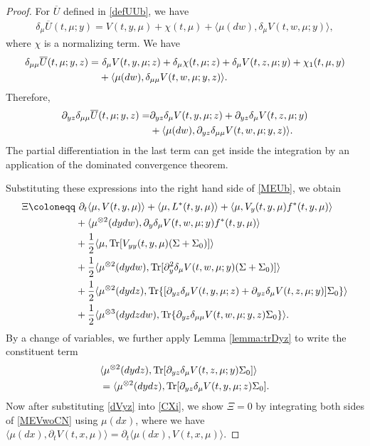 \documentclass{amsart}
\theoremstyle{definition}
\theoremstyle{remark}
\numberwithin{equation}{section}
\begin{document}
\begin{proof}
For $\overline U$ defined in \eqref{defUUb},
we  have
\begin{align}
\delta_\mu\overline U(t, \mu;y)= V(t,y,\mu) + \chi(t,\mu) +\langle \mu(dw), \delta_\mu V(t, w, \mu;y) \rangle, \label{oUdmu1}
\end{align}
where $\chi$ is a normalizing term.
We have
\begin{align}
\delta_{\mu\mu}\overline U(t, \mu; y,z) = &\ \delta_\mu V(t, y, \mu; z)+\delta_\mu\chi(t, \mu;z) +\delta_\mu V(t, z, \mu; y)+\chi_1(t,\mu,y) \label{oUdu2}\\
&  +\langle \mu(dw),  \delta_{\mu\mu} V (t,w,\mu;y,z) \rangle.\notag
\end{align}
Therefore,
\begin{align}
\partial_{yz}\delta_{\mu\mu}\overline U(t, \mu; y,z) =&\partial_{yz}\delta_\mu V(t, y, \mu; z) +\partial_{yz}\delta_\mu V(t, z, \mu; y) \label{oUdmu3}\\
& +\langle \mu(dw),  \partial_{yz}\delta_{\mu\mu} V (t,w,\mu;y,z) \rangle.\notag
\end{align}
The partial differentiation in the last term can get inside the integration by an application of the dominated convergence theorem.

Substituting these expressions into the right hand side of \eqref{MEUb}, we
obtain
\begin{align}
\Xi \coloneqq&\  \partial_t\langle \mu, V(t,y,\mu)\rangle +\langle \mu,  L^*(t,y, \mu)    \rangle
+ \langle\mu ,  V_y(t,y,\mu) f^*(t, y,\mu)\rangle
   \label{CXi}\\
&+
 \langle \mu^{\otimes2}(dydw), \partial_y \delta_\mu V (t,w, \mu; y) f^*(t, y, \mu)   \rangle \notag  \\
& + \frac12 \langle \mu,  {\rm Tr} [
V_{yy}(t,y,\mu)(\Sigma +\Sigma_0)]  \rangle \notag  \\
&  + \frac12 \langle \mu^{\otimes 2}(dydw),  {\rm Tr} [\partial_{y}^2  \delta_\mu V (t,w,\mu;y)(\Sigma +\Sigma_0)]  \rangle  \nonumber\\
& + \frac12 \langle  \mu^{\otimes2}(dydz),   \mbox{Tr}\{[ \partial_{yz} \delta_{\mu} V(t, y, \mu; z) + \partial_{yz}\delta_{\mu} V(t, z, \mu; y)] \Sigma_0\}      \rangle  \notag\\
& + \frac12 \langle  \mu^{\otimes3}(dydzdw),   \mbox{Tr}\{ \partial_{yz} \delta_{\mu\mu} V(t, w, \mu;y, z)  \Sigma_0\}      \rangle     \notag  .
\end{align}
 By a change of variables, we further apply Lemma \ref{lemma:trDyz} to write the constituent term
\begin{align}
 & \langle  \mu^{\otimes2}(dydz),   \mbox{Tr}[\partial_{yz}\delta_{\mu} V(t, z, \mu; y)\Sigma_0]      \rangle\notag \\
&=  \langle  \mu^{\otimes2}(dydz),   \mbox{Tr}[\partial_{yz}\delta_{\mu} V(t, y, \mu; z)\Sigma_0].
 \label{dVyz}
\end{align}
 Now after substituting \eqref{dVyz} into \eqref{CXi}, we show $\Xi=0$
by integrating both sides of \eqref{MEVwoCN} using $\mu(dx)$, where we have $\langle \mu(dx), \partial_t V(t,x,\mu)\rangle = \partial_t\langle \mu(dx),  V(t,x,\mu)\rangle$.
\end{proof}
\end{document}
